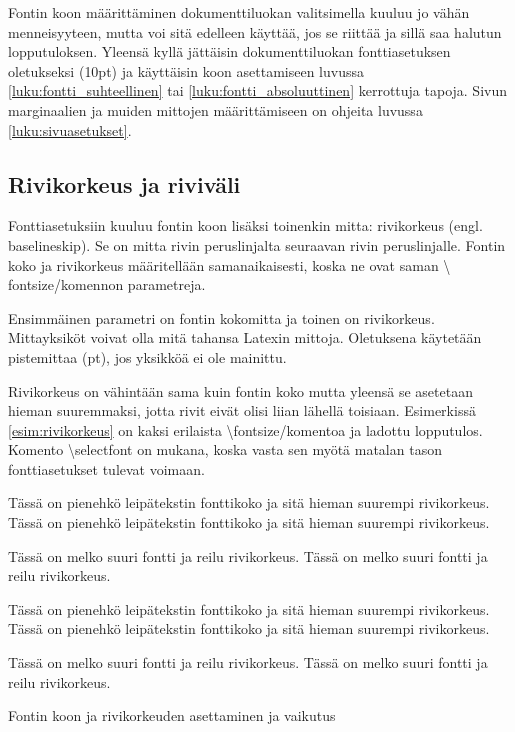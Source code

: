 \documentclass[a4paper,10pt,notitlepage,oneside]{book}
\newcommand{\keno}{\textbackslash}
\newcommand{\koodi}[1]{\textsf{#1}}
\begin{document}
Fontin koon määrittäminen dokumenttiluokan valitsimella kuuluu jo vähän
menneisyyteen, mutta voi sitä edelleen käyttää, jos se riittää ja sillä
saa halutun lopputuloksen. Yleensä kyllä jättäisin dokumenttiluokan
fontti\-asetuksen oletukseksi (\koodi{10pt}) ja käyttäisin koon
asettamiseen luvussa \ref{luku:fontti_suhteellinen} tai
\ref{luku:fontti_absoluuttinen} kerrottuja tapoja. Sivun marginaalien ja
muiden mittojen määrittämiseen on ohjeita luvussa
\ref{luku:sivuasetukset}.

\subsection{Rivikorkeus ja riviväli}

Fontti\-asetuksiin kuuluu fontin koon lisäksi toinenkin mitta:
rivikorkeus (engl. \textenglish{base\-line\-skip}). Se on mitta rivin
peruslinjalta seuraavan rivin peruslinjalle. Fontin koko ja rivikorkeus
määritellään saman\-aikaisesti, koska ne ovat saman \koodi{\keno
  font\-size}\-/komennon parametreja.

\begin{koodilohkosis}
  \fontsize{10pt}{12pt} \selectfont
\end{koodilohkosis}

Ensimmäinen parametri on fontin kokomitta ja toinen on rivikorkeus.
Mitta\-yksiköt voivat olla mitä tahansa Latexin mittoja. Oletuksena
käytetään pistemittaa (pt), jos yksikköä ei ole mainittu.

Rivikorkeus on vähintään sama kuin fontin koko mutta yleensä se
asetetaan hieman suuremmaksi, jotta rivit eivät olisi liian lähellä
toisiaan. Esimerkissä \ref{esim:rivikorkeus} on kaksi erilaista
\koodi{\keno font\-size}\-/komentoa ja ladottu lopputulos. Komento
\koodi{\keno select\-font} on mukana, koska vasta sen myötä matalan
tason fontti\-asetukset tulevat voimaan.

\begin{esimerkki}
\begin{koodilohko}
  \fontsize{10pt}{12pt}\selectfont Tässä on pienehkö leipätekstin
  fonttikoko ja sitä hieman suurempi rivikorkeus. Tässä on pienehkö
  leipätekstin fonttikoko ja sitä hieman suurempi rivikorkeus.

  \fontsize{16pt}{25pt}\selectfont Tässä on melko suuri fontti ja
  reilu rivikorkeus. Tässä on melko suuri fontti ja reilu
  rivikorkeus.
\end{koodilohko}
\centering
\parbox{.9\textwidth}{%
  \linespread{1}
  \fontsize{10pt}{12pt}\selectfont Tässä on pienehkö leipätekstin
  fonttikoko ja sitä hieman suurempi rivikorkeus. Tässä on
  pienehkö leipätekstin fonttikoko ja sitä hieman suurempi
  rivikorkeus.

  \fontsize{16pt}{25pt}\selectfont Tässä on melko suuri fontti ja
  reilu rivikorkeus. Tässä on melko suuri fontti ja reilu
  rivikorkeus.
}
\vspace{3ex}
\caption{Fontin koon ja rivikorkeuden asettaminen ja vaikutus}
\label{esim:rivikorkeus}
\end{esimerkki}
\end{document}
